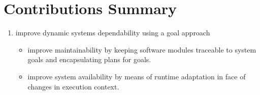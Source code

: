 
\section{Contributions Summary}

\begin{enumerate}

\item improve dynamic systems dependability using a goal approach
\begin{itemize}
  \item improve maintainability by keeping software modules traceable to system goals and encapsulating plans for goals.
  \item improve system availability by means of runtime adaptation in face of changes in execution context.
\end{itemize}




\end{enumerate}
